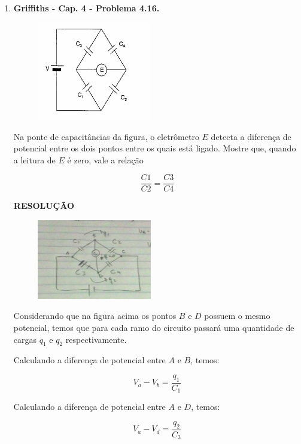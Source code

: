 \documentclass[11pt,a4paper]{article}
\begin{document}
\begin{enumerate}
\begin{enumerate}
\end{enumerate}


\item \textbf{Griffiths - Cap. 4 - Problema 4.16.}

\begin{figure}[h]	
\centering %
\includegraphics[width=5cm]{Selection_086.jpg} 
\end{figure}

Na ponte de capacitâncias da figura, o eletrômetro $E$ detecta a diferença de potencial entre os dois pontos entre os quais está ligado. Mostre que, quando a leitura de $E$ é zero, vale a relação

$$\displaystyle\dfrac{C1}{C2} = \displaystyle\dfrac{C3}{C4}$$

\textbf{RESOLUÇÃO}

\begin{figure}[h]	
\centering %
\includegraphics[width=5cm]{Selection_087.jpg} 
\end{figure}

Considerando que na figura acima os pontos $B$ e $D$ possuem o mesmo potencial, temos que para cada ramo do circuito passará uma quantidade de cargas $q_1$ e $q_2$ respectivamente. 

Calculando a diferença de potencial entre $A$ e $B$, temos:

\begin{equation}
V_a - V_b = \displaystyle\dfrac{q_1}{C_1}
\label{eq1}
\end{equation}

Calculando a diferença de potencial entre $A$ e $D$, temos:

\begin{equation}
V_a - V_d = \displaystyle\dfrac{q_2}{C_3}
\label{eq2}
\end{equation}


\end{enumerate}
\end{document}

